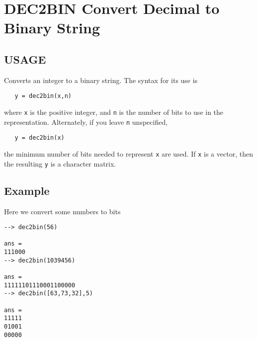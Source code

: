 \section{DEC2BIN Convert Decimal to Binary String}

\subsection{USAGE}

Converts an integer to a binary string.  The syntax for its
use is
\begin{verbatim}
   y = dec2bin(x,n)
\end{verbatim}
where \verb|x| is the positive integer, and \verb|n| is the number of
bits to use in the representation.  Alternately, if you leave
\verb|n| unspecified, 
\begin{verbatim}
   y = dec2bin(x)
\end{verbatim}
the minimum number of bits needed to represent \verb|x| are used.
If \verb|x| is a vector, then the resulting \verb|y| is a character
matrix.
\subsection{Example}

Here we convert some numbers to bits
\begin{verbatim}
--> dec2bin(56)

ans = 
111000
--> dec2bin(1039456)

ans = 
11111101110001100000
--> dec2bin([63,73,32],5)

ans = 
11111
01001
00000
\end{verbatim}
